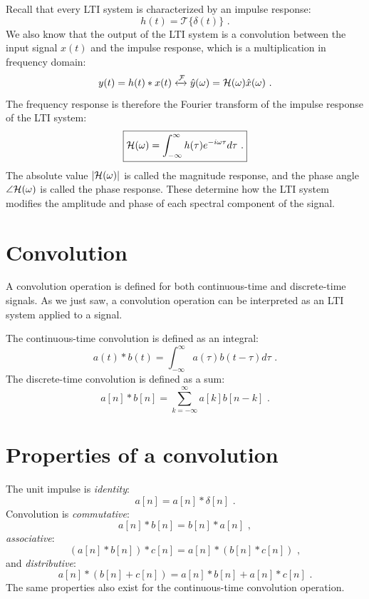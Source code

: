 Recall that every LTI system is characterized by an impulse response:
\begin{equation}
h(t) = \mathcal{T}\{\delta(t)\}\,\,.
\end{equation}
We also know that the output of the LTI system is a convolution between the input signal $x(t)$ and the impulse response, 
which is a multiplication in frequency domain:
\begin{equation}
y(t) = h(t)*x(t) \xleftrightarrow{\mathcal{F}} \hat{y}(\omega) = \mathcal{H}(\omega) \hat{x}(\omega)\,\,.
\end{equation}
The frequency response is therefore the Fourier transform of the impulse response of the LTI system:
\begin{equation}
\boxed{
\mathcal{H}(\omega) = \int_{-\infty}^{\infty} h(\tau)e^{-i\omega \tau}  d\tau\,\,.
}
\end{equation}
The absolute value $|\mathcal{H}(\omega)|$ is called the  magnitude response, and the phase angle $\angle \mathcal{H}(\omega)$ is 
called the  phase response. These determine how the LTI system modifies 
the amplitude and phase of each spectral component of the signal.

\newpage
\section{Convolution}

A convolution operation is defined for both continuous-time and
discrete-time signals. As we just saw, a convolution operation can be
interpreted as an LTI system applied to a signal.

The continuous-time convolution is defined as an integral:
\begin{equation}
\boxed{
  a(t)*b(t) = \int_{-\infty}^{\infty}a(\tau)b(t-\tau)d\tau\,\,.
}
\end{equation}
The discrete-time convolution is defined as a sum:
\begin{equation}
\boxed{
  a[n]*b[n] = \sum_{k=-\infty}^{\infty}a[k]b[n-k]\,\,.
}
\end{equation}

\section{Properties of a convolution}

The unit impulse is \emph{identity}:
\begin{equation}
  \boxed{
    a[n] = a[n]*\delta[n]\,\,.
    } 
\end{equation}
Convolution is \emph{commutative}:
\begin{equation}
  \boxed{
    a[n]*b[n] = b[n]*a[n]\,\,,
    }
\end{equation}
\emph{associative}:
\begin{equation}
    \boxed{
      (a[n]*b[n])*c[n] = a[n]*(b[n]*c[n])\,\,,
      }
\end{equation}
and \emph{distributive}:
\begin{equation}
    \boxed{
      a[n]*(b[n]+c[n]) = a[n]*b[n] + a[n]*c[n]\,\,.
      }
\end{equation}
The same properties also exist for the continuous-time convolution
operation.


